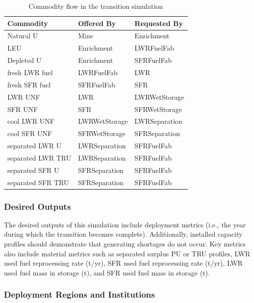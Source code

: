 \begin{table}[htbp!]
\centering
\begin{tabular}{|l|l|l|}
\hline
Commodity  &     Offered By  &    Requested By \\
\hline
Natural  U & Mine & Enrichment \\ 
LEU & Enrichment & LWRFuelFab \\ 
Depleted U & Enrichment & SFRFuelFab \\ 
fresh LWR fuel & LWRFuelFab & LWR \\ 
fresh SFR fuel & SFRFuelFab & SFR \\ 
LWR UNF & LWR & LWRWetStorage \\ 
SFR UNF & SFR & SFRWetStorage \\ 
cool LWR UNF & LWRWetStorage & LWRSeparation \\ 
cool SFR UNF & SFRWetStorage & SFRSeparation \\ 
separated LWR U & LWRSeparation & SFRFuelFab \\ 
separated LWR TRU & LWRSeparation & SFRFuelFab \\ 
separated SFR U & SFRSeparation & SFRFuelFab \\ 
separated SFR TRU & SFRSeparation & SFRFuelFab \\ 
\hline
\end{tabular}
\caption{Commodity flow in the transition simulation}
\label{tab:commods}
\end{table}

\subsubsection{Desired Outputs}

The desired outputs of this simulation include deployment metrics (i.e., the 
year during which the transition becomes complete). Additionally, installed 
capacity profiles should demonstrate that generating shortages do not occur. 
Key metrics also include material metrics such as separated surplus PU or TRU 
profiles, LWR used fuel reprocessing rate (t/yr), \gls{SFR} used fuel reprocessing 
rate (t/yr),  \gls{LWR} used fuel mass in storage (t), and \gls{SFR} used fuel mass in 
storage (t).

\subsubsection{Deployment Regions and Institutions}

